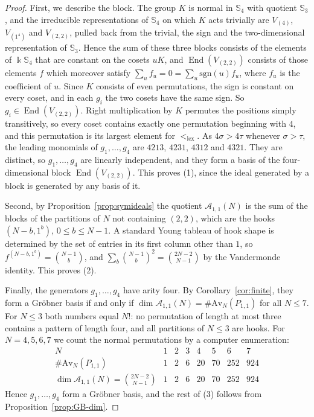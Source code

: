 \documentclass[11pt]{amsart}
\theoremstyle{definition}
\theoremstyle{remark}
\newcommand{\bS}{\mathbb{S}}
\newcommand{\kk}{\Bbbk}
\newcommand{\sgn}{\mathrm{sgn}}
\newcommand{\cA}{\mathscr{A}}
\newcommand{\Av}{\mathrm{Av}}
\newcommand{\lex}{\mathrm{lex}}
\newcommand{\End}{\operatorname{End}}
\begin{document}
\begin{proof}
First, we describe the block. The group $K$ is normal in $\bS_4$ with quotient $\bS_3$, and the irreducible representations of $\bS_4$ on which $K$ acts trivially are $V_{(4)}$, $V_{(1^4)}$ and $V_{(2,2)}$, pulled back from the trivial, the sign and the two-dimensional representation of $\bS_3$. Hence the sum of these three blocks consists of the elements of $\kk\bS_4$ that are constant on the cosets $uK$, and $\End(V_{(2,2)})$ consists of those elements $f$ which moreover satisfy $\sum_uf_u=0=\sum_u\sgn(u)f_u$, where $f_u$ is the coefficient of $u$. Since $K$ consists of even permutations, the sign is constant on every coset, and in each $g_i$ the two cosets have the same sign. So $g_i\in\End(V_{(2,2)})$. Right multiplication by $K$ permutes the positions simply transitively, so every coset contains exactly one permutation beginning with $4$, and this permutation is its largest element for $<_\lex$. As $4\sigma>4\tau$ whenever $\sigma>\tau$, the leading monomials of $g_1,\dots,g_4$ are $4213$, $4231$, $4312$ and $4321$. They are distinct, so $g_1,\dots,g_4$ are linearly independent, and they form a basis of the four-dimensional block $\End(V_{(2,2)})$. This proves (1), since the ideal generated by a block is generated by any basis of it.

Second, by Proposition~\ref{prop:symideals} the quotient $\cA_{1,1}(N)$ is the sum of the blocks of the partitions of $N$ not containing $(2,2)$, which are the hooks $(N-b,1^b)$, $0\le b\le N-1$. A standard Young tableau of hook shape is determined by the set of entries in its first column other than $1$, so $f^{(N-b,1^b)}=\binom{N-1}{b}$, and $\sum_b\binom{N-1}{b}^2=\binom{2N-2}{N-1}$ by the Vandermonde identity. This proves (2).

Finally, the generators $g_1,\dots,g_4$ have arity four. By Corollary~\ref{cor:finite}, they form a Gr\"obner basis if and only if $\dim\cA_{1,1}(N)=\#\Av_N(P_{1,1})$ for all $N\le7$. For $N\le3$ both numbers equal $N!$: no permutation of length at most three contains a pattern of length four, and all partitions of $N\le3$ are hooks. For $N=4,5,6,7$ we count the normal permutations by a computer enumeration:
\[
\begin{array}{c|ccccccc}
N & 1 & 2 & 3 & 4 & 5 & 6 & 7\\\hline
\#\Av_N(P_{1,1}) & 1 & 2 & 6 & 20 & 70 & 252 & 924\\
\dim\cA_{1,1}(N)=\binom{2N-2}{N-1} & 1 & 2 & 6 & 20 & 70 & 252 & 924
\end{array}
\]
Hence $g_1,\dots,g_4$ form a Gr\"obner basis, and the rest of (3) follows from Proposition~\ref{prop:GB-dim}.
\end{proof}
\end{document}
